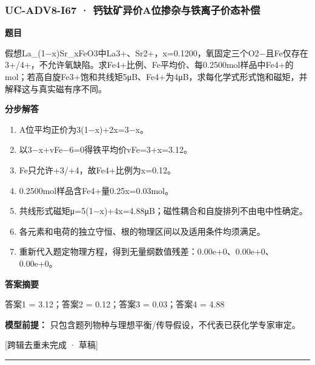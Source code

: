 \documentclass[UTF8,11pt,a4paper]{ctexart}
\begin{document}
\subsubsection*{UC-ADV8-I67 · 钙钛矿异价A位掺杂与铁离子价态补偿}
\noindent\textbf{题目}\par
假想La\_(1−x)Sr\_xFeO3中La3+、Sr2+，x=0.1200，氧固定三个O2−且Fe仅存在3+/4+，不允许氧缺陷。求Fe4+比例、Fe平均价、每0.2500mol样品中Fe4+的mol；若高自旋Fe3+饱和共线矩5μB、Fe4+为4μB，求每化学式形式饱和磁矩，并解释这与真实磁有序不同。\par
\medskip\noindent\textbf{分步解答}
\begin{enumerate}
\item A位平均正价为3(1−x)+2x=3−x。
\item 以3−x+vFe−6=0得铁平均价vFe=3+x=3.12。
\item Fe只允许+3/+4，故Fe4+比例为x=0.12。
\item 0.2500mol样品含Fe4+量0.25x=0.03mol。
\item 共线形式磁矩μ=5(1−x)+4x=4.88μB；磁性耦合和自旋排列不由电中性确定。
\item 各元素和电荷的独立守恒、根的物理区间以及适用条件均须满足。
\item 重新代入题定物理方程，得到无量纲数值残差：0.00e+0、0.00e+0、0.00e+0。
\end{enumerate}
\noindent\textbf{答案摘要}\par
答案1 = 3.12；答案2 = 0.12；答案3 = 0.03；答案4 = 4.88\par
\noindent\textbf{模型前提：}
只包含题列物种与理想平衡/传导假设，不代表已获化学专家审定。\par
\noindent\textcolor{red!65!black}{[跨辑去重未完成 · 草稿]} \par
\medskip\hrule\medskip
{}
\end{document}

